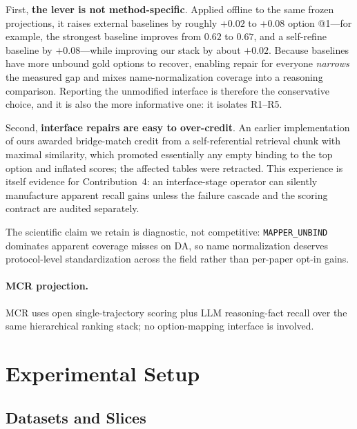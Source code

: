 First, \textbf{the lever is not method-specific}.
Applied offline to the same frozen projections, it raises external baselines by roughly $+0.02$ to $+0.08$ option @1---for example, the strongest baseline improves from $0.62$ to $0.67$, and a self-refine baseline by $+0.08$---while improving our stack by about $+0.02$.
Because baselines have more unbound gold options to recover, enabling repair for everyone \emph{narrows} the measured gap and mixes name-normalization coverage into a reasoning comparison.
Reporting the unmodified interface is therefore the conservative choice, and it is also the more informative one: it isolates R1--R5.

Second, \textbf{interface repairs are easy to over-credit}.
An earlier implementation of ours awarded bridge-match credit from a self-referential retrieval chunk with maximal similarity, which promoted essentially any empty binding to the top option and inflated scores; the affected tables were retracted.
This experience is itself evidence for Contribution~4: an interface-stage operator can silently manufacture apparent recall gains unless the failure cascade and the scoring contract are audited separately.

The scientific claim we retain is diagnostic, not competitive: \texttt{MAPPER\_UNBIND} dominates apparent coverage misses on DA, so name normalization deserves protocol-level standardization across the field rather than per-paper opt-in gains.

\paragraph{MCR projection.}
MCR uses open single-trajectory scoring plus LLM reasoning-fact recall over the same hierarchical ranking stack; no option-mapping interface is involved.

\section{Experimental Setup}
\label{sec:experiments}

\subsection{Datasets and Slices}
\label{sec:data}

